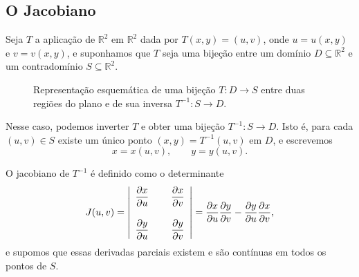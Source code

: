 \documentclass[12pt,portuguese]{article}
\theoremstyle{definition}
\theoremstyle{plainexercise}
\theoremstyle{starredexercise}
\theoremstyle{definition}
\begin{document}
\subsection{O Jacobiano}\label{subsec:jacobiano}
Seja $T$ a aplicação de $\mathbb{R}^2$ em $\mathbb{R}^2$ dada por
$T(x, y) = (u, v)$, onde $u = u(x, y)$ e $v = v(x, y)$, e suponhamos que $T$
seja uma bijeção entre um domínio $D \subseteq \mathbb{R}^2$ e um contradomínio
$S \subseteq \mathbb{R}^2$. 
\begin{figure}[H]
\centering
{}
\caption{Representação esquemática de uma bijeção $T:D\to S$
entre duas regiões do plano e de sua inversa $T^{-1}:S\to D$.}
\label{fig:bijecao-mudanca-variaveis}
\end{figure}
Nesse caso, podemos inverter $T$ e obter uma
bijeção $T^{-1} : S \to D$. Isto é, para cada $(u, v) \in S$ existe um único
ponto $(x, y) = T^{-1}(u, v)$ em $D$, e escrevemos
\[
  x = x(u, v), \qquad y = y(u, v).
\]

O jacobiano de $T^{-1}$ é definido como o determinante
\begin{equation}
\label{eq:jacobiano}
  J(u, v)
  = \left|
    \begin{array}{>{\displaystyle}c@{\hspace{0.8cm}}>{\displaystyle}c}
      \frac{\partial x}{\partial u} & \frac{\partial x}{\partial v} 
      \\[0.6cm]
      \frac{\partial y}{\partial u} & \frac{\partial y}{\partial v}
    \end{array}
    \right|
  = \frac{\partial x}{\partial u} \frac{\partial y}{\partial v}
  - \frac{\partial y}{\partial u} \frac{\partial x}{\partial v},
\end{equation}
e supomos que essas derivadas parciais existem e são contínuas em todos os
pontos de $S$.
\end{document}
